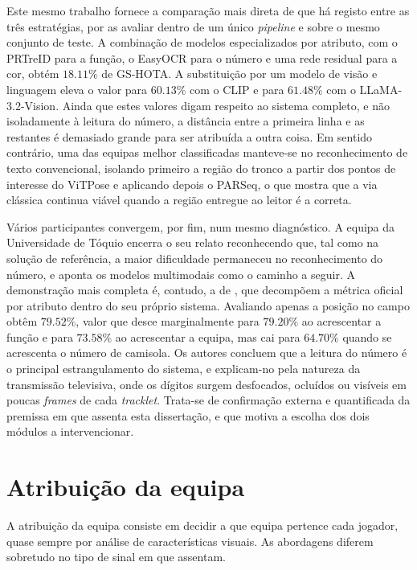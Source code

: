 Este mesmo trabalho fornece a comparação mais direta de que há registo entre as três
estratégias, por as avaliar dentro de um único \emph{pipeline} e sobre o mesmo conjunto de
teste. A combinação de modelos especializados por atributo, com o PRTreID para a função, o
EasyOCR para o número e uma rede residual para a cor, obtém $18{.}11\%$ de GS-HOTA. A
substituição por um modelo de visão e linguagem eleva o valor para $60{.}13\%$ com o CLIP e
para $61{.}48\%$ com o LLaMA-3.2-Vision. Ainda que estes valores digam respeito ao sistema
completo, e não isoladamente à leitura do número, a distância entre a primeira linha e as
restantes é demasiado grande para ser atribuída a outra coisa. Em sentido contrário, uma
das equipas melhor classificadas manteve-se no reconhecimento de texto convencional,
isolando primeiro a região do tronco a partir dos pontos de interesse do ViTPose e
aplicando depois o PARSeq, o que mostra que a via clássica continua viável quando a região
entregue ao leitor é a correta.

Vários participantes convergem, por fim, num mesmo diagnóstico. A equipa da Universidade de
Tóquio encerra o seu relato reconhecendo que, tal como na solução de referência, a maior
dificuldade permaneceu no reconhecimento do número, e aponta os modelos multimodais como o
caminho a seguir. A demonstração mais completa é, contudo, a de \citet{oo2026broadcast2pitch},
que decompõem a métrica oficial por atributo dentro do seu próprio sistema. Avaliando apenas
a posição no campo obtêm $79{.}52\%$, valor que desce marginalmente para $79{.}20\%$ ao
acrescentar a função e para $73{.}58\%$ ao acrescentar a equipa, mas cai para $64{.}70\%$
quando se acrescenta o número de camisola. Os autores concluem que a leitura do número é o
principal estrangulamento do sistema, e explicam-no pela natureza da transmissão televisiva,
onde os dígitos surgem desfocados, ocluídos ou visíveis em poucas \emph{frames} de cada
\emph{tracklet}. Trata-se de confirmação externa e quantificada da premissa em que assenta
esta dissertação, e que motiva a escolha dos dois módulos a intervencionar.

\section{Atribuição da equipa}

A atribuição da equipa consiste em decidir a que equipa pertence cada jogador, quase
sempre por análise de características visuais. As abordagens diferem sobretudo no tipo de
sinal em que assentam.

